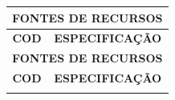 \documentclass{article} %
\begin{document}
\noindent\begin{longtable}[c]{m{1cm}|m{11cm}}

\multicolumn{2}{c}{\cellcolor{gray!50} \textcolor{vermelhoTitulo} {\normalsize \textbf{FONTES DE RECURSOS}}}\Tstrut  \\[2ex]
\hline\hline
 \multicolumn{1}{c|}{\textbf{COD}} & \multicolumn{1}{c}{\textbf{ESPECIFICAÇÃO}} \\

\hline
 \endfirsthead
 \multicolumn{2}{c}{\cellcolor{gray!50} \textcolor{vermelhoTitulo} {\normalsize \textbf{FONTES DE RECURSOS}}}\Tstrut  \\[2ex]
\hline\hline
 \multicolumn{1}{c|}{\textbf{COD}} & \multicolumn{1}{c}{\textbf{ESPECIFICAÇÃO}} \\
 \hline
  \endhead
 \endfoot

 \hline\hline\hline
 \endlastfoot


\end{longtable}
\end{document}
